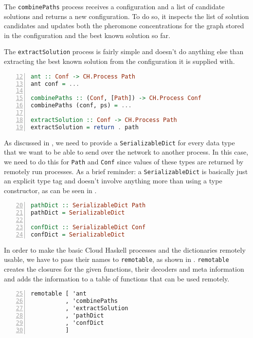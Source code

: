 The \texttt{combinePaths} process receives a configuration and a list of candidate solutions and returns a new configuration. To do so, it inspects the list of solution candidates and updates both the pheromone concentrations for the graph stored in the configuration and the best known solution so far.

The \texttt{extractSolution} process is fairly simple and doesn't do anything else than extracting the best known solution from the configuration it is supplied with.

\begin{lstlisting}[language=Haskell,frame=tb,numbers=left,firstnumber=12,label=lst:ant_basic,caption=Basic \textsf{Cloud Haskell} processes.]
ant :: Conf -> CH.Process Path
ant conf = ...

combinePaths :: (Conf, [Path]) -> CH.Process Conf
combinePaths (conf, ps) = ...

extractSolution :: Conf -> CH.Process Path
extractSolution = return . path
\end{lstlisting}

As discussed in , we need to provide a \texttt{SerializableDict} for every data type that we want to be able to send over the network to another process. In this case, we need to do this for \texttt{Path} and \texttt{Conf} since values of these types are returned by remotely run processes. As a brief reminder: a \texttt{SerializableDict} is basically just an explicit type tag and doesn't involve anything more than using a type constructor, as can be seen in .

\begin{lstlisting}[language=Haskell,frame=tb,numbers=left,firstnumber=20,label=lst:ant_dicts,caption=Dictionaries for serialisation.]
pathDict :: SerializableDict Path
pathDict = SerializableDict

confDict :: SerializableDict Conf
confDict = SerializableDict
\end{lstlisting}

In order to make the basic \textsf{Cloud Haskell} processes and the dictionaries remotely usable, we have to pass their names to \texttt{remotable}, as shown in . \texttt{remotable} creates the closures for the given functions, their decoders and meta information and adds the information to a table of functions that can be used remotely.

\begin{lstlisting}[language=Haskell,frame=tb,numbers=left,firstnumber=25,label=lst:ant_remotable,caption=Making processes and dictionaries remotable.]
remotable [ 'ant
          , 'combinePaths
          , 'extractSolution
          , 'pathDict
          , 'confDict
          ]
\end{lstlisting}

